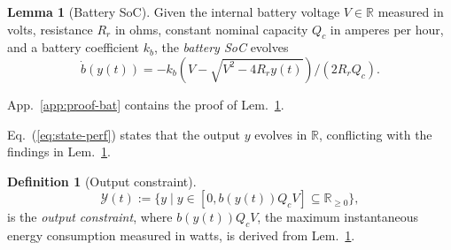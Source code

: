 \documentclass[letterpaper,10pt,journal,twoside]{IEEEtran}
\theoremstyle{definition}
\newtheorem{lem}[thm]{Lemma}
\newtheorem{defn}{Definition}[section]
\begin{document}
\begin{lem}[Battery SoC]\label{lem:bat}
  Given the internal battery voltage $V\in\mathbb{R}$ measured in volts, resistance $R_r$ in ohms, constant nominal capacity $Q_c$ in amperes per hour, and a battery coefficient $k_b$, the \emph{battery SoC} evolves
  \begin{equation*}
    \dot{b}(y(t))=-k_b\left(V-
  \sqrt{
    V^2-
    4R_ry(t)}
  \right)/(2R_rQ_c).
  \end{equation*}
\end{lem}

App.~\ref{app:proof-bat} contains the proof of Lem.~\ref{lem:bat}. 

Eq.~(\ref{eq:state-perf}) states that the output $y$ evolves in $\mathbb{R}$, conflicting with the findings in Lem.~\ref{lem:bat}.

\begin{defn}[Output constraint]\label{def:const}
  \begin{equation*}
    \mathcal{Y}(t):=\{y\mid y\in[0,b(y(t))Q_cV]\subseteq{\mathbb{R}_{\geq 0}}\},
  \end{equation*}
  is the \emph{output constraint}, where $b(y(t))Q_cV$, the maximum instantaneous energy consumption measured in watts, is derived from Lem.~\ref{lem:bat}.
\end{defn}



\end{document}
